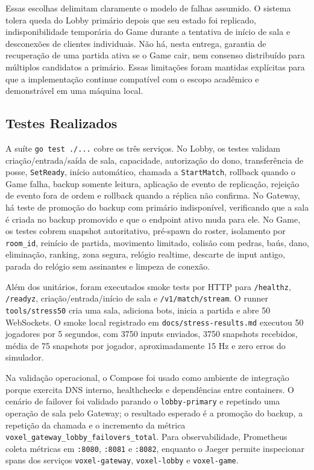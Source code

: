 \documentclass[portuguese]{sbcreviews-2025}%
\begin{document}
Essas escolhas delimitam claramente o modelo de falhas assumido. O sistema tolera queda do Lobby primário depois que seu estado foi replicado, indisponibilidade temporária do Game durante a tentativa de início de sala e desconexões de clientes individuais. Não há, nesta entrega, garantia de recuperação de uma partida ativa se o Game cair, nem consenso distribuído para múltiplos candidatos a primário. Essas limitações foram mantidas explícitas para que a implementação continue compatível com o escopo acadêmico e demonstrável em uma máquina local.

\subsection{Testes Realizados}

A suíte \texttt{go test ./...} cobre os três serviços. No Lobby, os testes validam criação/entrada/saída de sala, capacidade, autorização do dono, transferência de posse, \texttt{SetReady}, início automático, chamada a \texttt{StartMatch}, rollback quando o Game falha, backup somente leitura, aplicação de evento de replicação, rejeição de evento fora de ordem e rollback quando a réplica não confirma. No Gateway, há teste de promoção do backup com primário indisponível, verificando que a sala é criada no backup promovido e que o endpoint ativo muda para ele. No Game, os testes cobrem snapshot autoritativo, pré-spawn do roster, isolamento por \texttt{room\_id}, reinício de partida, movimento limitado, colisão com pedras, baús, dano, eliminação, ranking, zona segura, relógio realtime, descarte de input antigo, parada do relógio sem assinantes e limpeza de conexão.

Além dos unitários, foram executados smoke tests por HTTP para \texttt{/healthz}, \texttt{/readyz}, criação/entrada/início de sala e \texttt{/v1/match/stream}. O runner \texttt{tools/stress50} cria uma sala, adiciona bots, inicia a partida e abre 50 WebSockets. O smoke local registrado em \texttt{docs/stress-results.md} executou 50 jogadores por 5 segundos, com 3750 inputs enviados, 3750 snapshots recebidos, média de 75 snapshots por jogador, aproximadamente 15 Hz e zero erros do simulador.

Na validação operacional, o Compose foi usado como ambiente de integração porque exercita DNS interno, healthchecks e dependências entre containers. O cenário de failover foi validado parando o \texttt{lobby-primary} e repetindo uma operação de sala pelo Gateway; o resultado esperado é a promoção do backup, a repetição da chamada e o incremento da métrica \texttt{voxel\_gateway\_lobby\_failovers\_total}. Para observabilidade, Prometheus coleta métricas em \texttt{:8080}, \texttt{:8081} e \texttt{:8082}, enquanto o Jaeger permite inspecionar spans dos serviços \texttt{voxel-gateway}, \texttt{voxel-lobby} e \texttt{voxel-game}.
\end{document}
